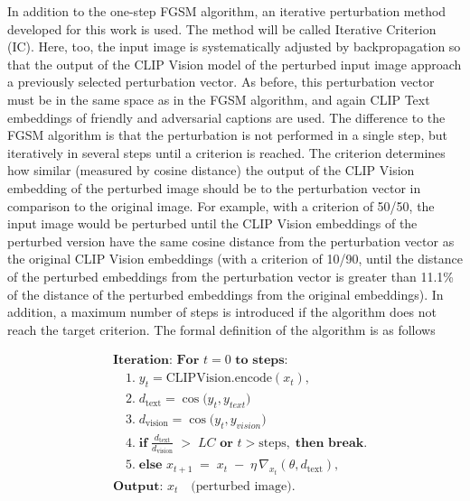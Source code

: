 In addition to the one-step FGSM algorithm, an iterative perturbation method developed for this work is used. The method will be called Iterative Criterion (IC). Here, too, the input image is systematically adjusted by backpropagation so that the output of the CLIP Vision model of the perturbed input image approach a previously selected perturbation vector. As before, this perturbation vector must be in the same space as in the FGSM algorithm, and again CLIP Text embeddings of friendly and adversarial captions are used. The difference to the FGSM algorithm is that the perturbation is not performed in a single step, but iteratively in several steps until a criterion is reached. The criterion determines how similar (measured by cosine distance) the output of the CLIP Vision embedding of the perturbed image should be to the perturbation vector in comparison to the original image. For example, with a criterion of 50/50, the input image would be perturbed until the CLIP Vision embeddings of the perturbed version have the same cosine distance from the perturbation vector as the original CLIP Vision embeddings (with a criterion of 10/90, until the distance of the perturbed embeddings from the perturbation vector is greater than 11.1\% of the distance of the perturbed embeddings from the original embeddings). In addition, a maximum number of steps is introduced if the algorithm does not reach the target criterion. The formal definition of the algorithm is as follows 

\[
\begin{aligned}
& \textbf{Iteration: For } t = 0 \textbf{ to steps:}\\
& \quad 1.\; y_t = \mathrm{CLIP Vision.encode}(x_t), \\[4pt]
& \quad 2.\; d_{\text{text}} = \cos \bigl(y_t, y_{text} \bigr) \\[4pt]
& \quad 3.\; d_{\text{vision}} = \cos \bigl(y_t, y_{vision} \bigr) \\[4pt]
& \quad 4.\; \textbf{if} \;\frac{d_{\text{text}}}{d_{\text{vision}}} 
\;>\; LC \textbf{ or } t > \text{steps}, \;\textbf{then break}.\\[6pt]
& \quad 5.\; \textbf{else } x_{t+1} 
\;=\; x_t \;-\; \eta \,\nabla_{x_t} (\theta, d_{\text{text}}), \\[4pt]
%
& \textbf{Output: } x_t \quad \text{(perturbed image)}.
\end{aligned}
\]

\noindent{}

